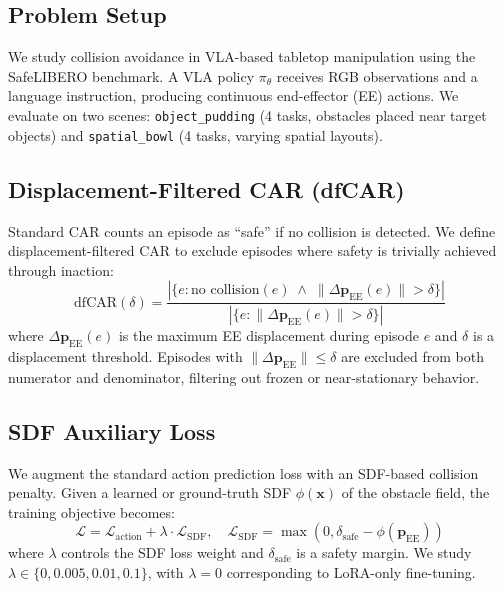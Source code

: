 \documentclass[letterpaper]{article}
\begin{document}
\subsection{Problem Setup}

We study collision avoidance in VLA-based tabletop manipulation using the SafeLIBERO benchmark. A VLA policy $\pi_\theta$ receives RGB observations and a language instruction, producing continuous end-effector (EE) actions. We evaluate on two scenes: \texttt{object\_pudding} (4 tasks, obstacles placed near target objects) and \texttt{spatial\_bowl} (4 tasks, varying spatial layouts).

\subsection{Displacement-Filtered CAR (dfCAR)}

Standard CAR counts an episode as ``safe'' if no collision is detected. We define displacement-filtered CAR to exclude episodes where safety is trivially achieved through inaction:
\begin{equation}
    \text{dfCAR}(\delta) = \frac{|\{e : \text{no collision}(e) \;\wedge\; \|\Delta \mathbf{p}_{\text{EE}}(e)\| > \delta \}|}{|\{e : \|\Delta \mathbf{p}_{\text{EE}}(e)\| > \delta\}|}
\end{equation}
where $\Delta \mathbf{p}_{\text{EE}}(e)$ is the maximum EE displacement during episode $e$ and $\delta$ is a displacement threshold. Episodes with $\|\Delta \mathbf{p}_{\text{EE}}\| \leq \delta$ are excluded from both numerator and denominator, filtering out frozen or near-stationary behavior.

\subsection{SDF Auxiliary Loss}

We augment the standard action prediction loss with an SDF-based collision penalty. Given a learned or ground-truth SDF $\phi(\mathbf{x})$ of the obstacle field, the training objective becomes:
\begin{equation}
    \mathcal{L} = \mathcal{L}_{\text{action}} + \lambda \cdot \mathcal{L}_{\text{SDF}}, \quad \mathcal{L}_{\text{SDF}} = \max(0, \delta_{\text{safe}} - \phi(\mathbf{p}_{\text{EE}}))
\end{equation}
where $\lambda$ controls the SDF loss weight and $\delta_{\text{safe}}$ is a safety margin. We study $\lambda \in \{0, 0.005, 0.01, 0.1\}$, with $\lambda=0$ corresponding to LoRA-only fine-tuning.
\end{document}
